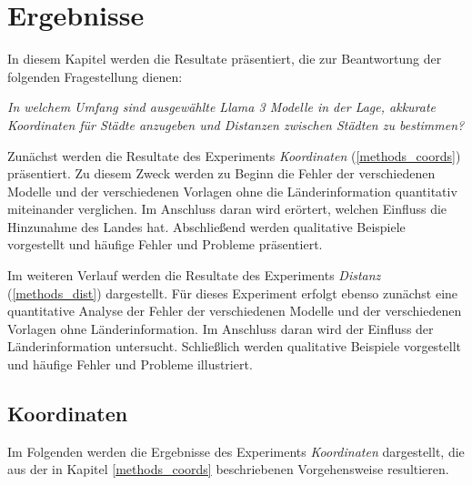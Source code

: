 \chapter{Ergebnisse}
\label{ch:results}

\newcommand{\regex}{\textit{regex}}
\newcommand{\llm}{\textit{llm}}
\newcommand{\json}{\textit{json}}

\newcommand{\regexv}{{\regex}-Verfahren}
\newcommand{\llmv}{{\llm}-Verfahren}
\newcommand{\jsonv}{{\json}-Verfahren}


In diesem Kapitel werden die Resultate präsentiert, die zur Beantwortung der folgenden Fragestellung dienen:

\begin{center}
    \itshape
    In welchem Umfang sind ausgewählte Llama 3 Modelle in der Lage, akkurate Koordinaten für Städte anzugeben und Distanzen zwischen Städten zu bestimmen?
\end{center}

Zunächst werden die Resultate des Experiments \textit{Koordinaten} (\ref{methods_coords}) präsentiert.
Zu diesem Zweck werden zu Beginn die Fehler der verschiedenen Modelle und der verschiedenen Vorlagen ohne die Länderinformation quantitativ miteinander verglichen.
Im Anschluss daran wird erörtert, welchen Einfluss die Hinzunahme des Landes hat.
Abschließend werden qualitative Beispiele vorgestellt und häufige Fehler und Probleme präsentiert.

Im weiteren Verlauf werden die Resultate des Experiments \textit{Distanz} (\ref{methods_dist}) dargestellt.
Für dieses Experiment erfolgt ebenso zunächst eine quantitative Analyse der Fehler der verschiedenen Modelle und der verschiedenen Vorlagen ohne Länderinformation.
Im Anschluss daran wird der Einfluss der Länderinformation untersucht.
Schließlich werden qualitative Beispiele vorgestellt und häufige Fehler und Probleme illustriert.

\section{Koordinaten}
\label{results_coords}
Im Folgenden werden die Ergebnisse des Experiments \textit{Koordinaten} dargestellt, die aus der in Kapitel \ref{methods_coords} beschriebenen Vorgehensweise resultieren.

